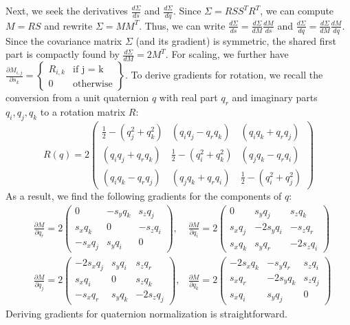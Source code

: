 \begin{appendix}
	Next, we seek the derivatives $\frac{d\Sigma}{ds}$ and $\frac{d\Sigma}{dq}$. Since $\Sigma = RSS^TR^T$, we can compute $M = RS$ and rewrite $\Sigma = MM^T$. Thus, we can write $\frac{d\Sigma}{ds} = \frac{d\Sigma}{dM} \frac{dM}{ds}$ and $\frac{d\Sigma}{dq} = \frac{d\Sigma}{dM} \frac{dM}{dq}$. Since the covariance matrix $\Sigma$ (and its gradient) is symmetric, the shared first part is compactly found by $\frac{d\Sigma}{dM} = 2M^T$. For scaling, we further have
	$	\frac{\partial M_{i,j}}{\partial s_k} =  \left\{\begin{array}{lr}
		R_{i,k} & \text{if j = k}\\
		0 & \text{otherwise}
	\end{array}\right\}$.
	To derive gradients for rotation, we recall the conversion from a unit quaternion $q$ with real part $q_r$ and imaginary parts $q_i, q_j, q_k$ to a rotation matrix $R$:
	\begin{equation}
		R(q) = 2\begin{pmatrix}
			\frac{1}{2} - (q_j^2 + q_k^2) & (q_i q_j - q_r q_k) & (q_i q_k + q_r q_j)\\
			(q_i q_j + q_r q_k) & \frac{1}{2} - (q_i^2 + q_k^2) & (q_j q_k - q_r q_i)\\
			(q_i q_k - q_r q_j) & (q_j q_k + q_r q_i) & \frac{1}{2} - (q_i^2 + q_j^2)
		\end{pmatrix}
		\label{eq:quat}
	\end{equation}
	As a result, we find the following gradients for the components of $q$:
	\begin{equation}
		\begin{aligned}
			&\frac{\partial M}{\partial q_r} = 2 \left(\begin{smallmatrix}
				0 & -s_y q_k & s_z q_j\\
				s_x q_k & 0 & -s_z q_i\\
				-s_x q_j & s_y q_i & 0
			\end{smallmatrix}\right), 
			&\frac{\partial M}{\partial q_i} = 2\left(\begin{smallmatrix}
				0 & s_y q_j & s_z q_k\\
				s_x q_j & -2 s_y q_i & -s_z q_r\\
				s_x q_k & s_y q_r & -2 s_z q_i
			\end{smallmatrix}\right)
			\\
			&\frac{\partial M}{\partial q_j} = 2\left(\begin{smallmatrix}
				-2 s_x q_j & s_y q_i & s_z q_r\\
				s_x q_i & 0 & s_z q_k\\
				-s_x q_r & s_y q_k & -2s_z q_j
			\end{smallmatrix}\right),
			&\frac{\partial M}{\partial q_k} = 2\left(\begin{smallmatrix}
				-2 s_x q_k & -s_y q_r & s_z q_i\\
				s_x q_r & -2s_y q_k & s_z q_j\\
				s_x q_i & s_y q_j & 0
			\end{smallmatrix}\right)
		\end{aligned}
	\end{equation} 
Deriving gradients for quaternion normalization is straightforward.
	

\end{appendix}
